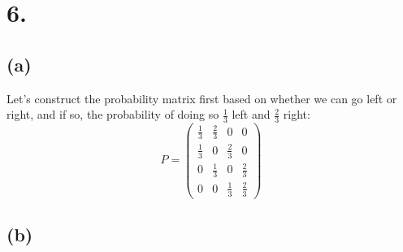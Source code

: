 \documentclass{article}
\begin{document}
{\Large 

\section*{6.}

\subsection*{(a)} 

Let's construct the probability matrix first based on whether we can go left or right, and if so, the probability of doing so \(\frac{1}{3}\) left and \(\frac{2}{3}\) right: 
\[
  P = 
  \begin{pmatrix}
    \frac{1}{3} & \frac{2}{3} & 0 & 0 \\
    \frac{1}{3} & 0 & \frac{2}{3} & 0 \\
    0 & \frac{1}{3} & 0 & \frac{2}{3} \\
    0 & 0 & \frac{1}{3} & \frac{2}{3}
  \end{pmatrix}
\]

\subsection*{(b)}

}
\end{document}
